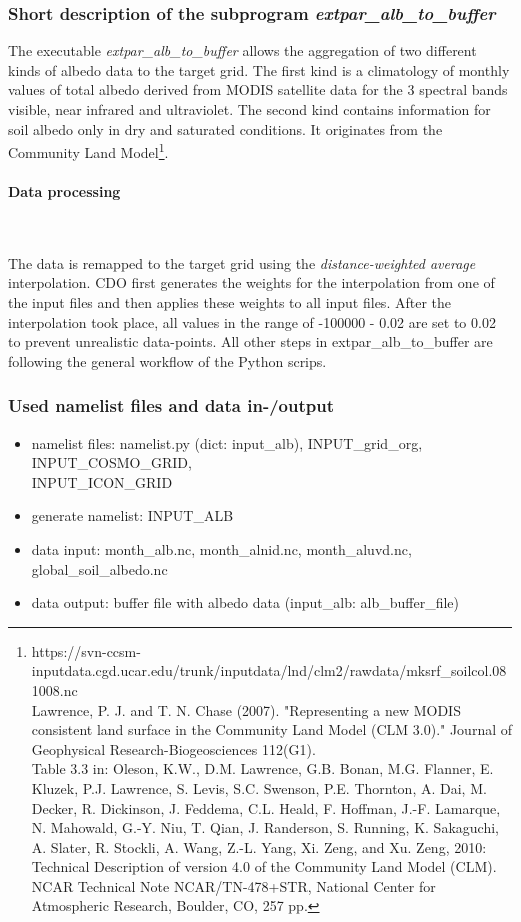 \documentclass[a4paper,10pt,DIV14,BCOR1cm,titlepage,twoside]{scrartcl}
\begin{document}
\subsubsection{Short description of the subprogram \textit{extpar\_alb\_to\_buffer}}
The executable \textit{extpar\_alb\_to\_buffer} allows the aggregation of two different kinds of albedo data to the target grid. The first kind is a climatology of monthly values of total albedo derived from MODIS satellite data for the 3 spectral bands visible, near infrared and ultraviolet. The second kind contains information for soil albedo only in dry and saturated conditions. It originates from the Community Land Model\footnote{https://svn-ccsm-inputdata.cgd.ucar.edu/trunk/inputdata/lnd/clm2/rawdata/mksrf\_soilcol.081008.nc \\ Lawrence, P. J. and T. N. Chase (2007). "Representing a new MODIS consistent land surface in the Community Land Model (CLM 3.0)." Journal of Geophysical Research-Biogeosciences 112(G1). \\Table 3.3 in: Oleson, K.W., D.M. Lawrence, G.B. Bonan, M.G. Flanner, E. Kluzek, P.J. Lawrence, S. Levis, S.C. Swenson, P.E. Thornton, A. Dai, M. Decker, R. Dickinson, J. Feddema, C.L. Heald, F. Hoffman, J.-F. Lamarque, N. Mahowald, G.-Y. Niu, T. Qian, J. Randerson, S. Running, K. Sakaguchi, A. Slater, R. Stockli, A. Wang, Z.-L. Yang, Xi. Zeng, and Xu. Zeng, 2010: Technical Description of version 4.0 of the Community Land Model (CLM). NCAR Technical Note NCAR/TN-478+STR, National Center for Atmospheric Research, Boulder, CO, 257 pp.}.\par\medskip\noindent
\paragraph{Data processing} \ \par\medskip\noindent
The data is remapped to the target grid using the \textit{distance-weighted average} interpolation. CDO first generates the weights for the interpolation from one of the input files and then applies these weights to all input files. After the interpolation took place, all values in the range of -100000 - 0.02 are set to 0.02 to prevent unrealistic data-points. All other steps in extpar\_alb\_to\_buffer are following the general workflow of the Python scrips.\par\medskip\noindent

\subsubsection{Used namelist files and data in-/output}
\begin{itemize}
  \item namelist files: namelist.py (dict: input\_alb), INPUT\_grid\_org, INPUT\_COSMO\_GRID, \\
        INPUT\_ICON\_GRID
  \item generate namelist: INPUT\_ALB
  \item data input: month\_alb.nc, month\_alnid.nc, month\_aluvd.nc, global\_soil\_albedo.nc
  \item data output: buffer file with albedo data (input\_alb: alb\_buffer\_file)
\end{itemize}
\end{document}
